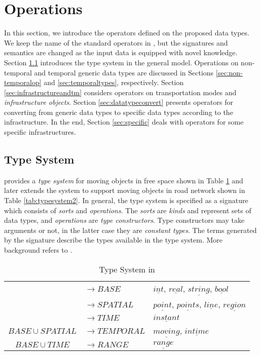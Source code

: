 \section{Operations}
\label{sec:operations}
In this section, we introduce the operators defined on the proposed data types. 
We keep the name of the standard operators in \cite{GBE+00}, but the signatures and semantics 
are changed as the input data is equipped with novel knowledge. Section \ref{sec:extendedtypesystem}
introduces the type system in the general model. 
Operations on non-temporal and temporal generic data types are discussed in Sections \ref{sec:non-temporalop} and \ref{sec:temporaltypes}, respectively. Section \ref{sec:infrastructureandtm} considers operators on transportation modes and \textit{infrastructure objects}.  Section \ref{sec:datatypeconvert} presents operators for converting from generic data types to specific data types according to the infrastructure. In the end, Section \ref{sec:specific} deals with operators for some specific infrastructures.


\subsection{Type System}
\label{sec:extendedtypesystem}
\cite{GBE+00} provides a \textit{type system} for moving objects in free space shown in Table \ref{tab:typesystem1} and later \cite{GA2006} extends the system to support moving objects 
in road network shown in Table \ref{tab:typesystem2}. In general, the type system is specified as a signature which consists of \textit{sorts} and \textit{operations}. 
The \textit{sorts} are \textit{kinds} and represent sets of data types, and  
\textit{operations} are \textit{type constructors}. Type constructors may take arguments or not, in the latter case they are \textit{constant types}. The terms generated by the signature
describe the types available in the type system. More background refers to \cite{G1993}.

\begin{table}[ht]
 \begin{center} 
  \begin{tabular}{c|l|l}
	\hline
	\multirow{3}{*}{}&$\rightarrow BASE$&$\underline{int}$, $\underline{real}$, $\underline{string}$, $\underline{bool}$ \\
	& $\rightarrow SPATIAL$& $\underline{point}$, $\underline{points}$, $\underline{line}$, $\underline{region}$\\
	& $\rightarrow TIME$& $\underline{instant}$\\
	\hline
	$BASE\cup SPATIAL$&$\rightarrow TEMPORAL$&$\underline{moving}$, $\underline{intime}$\\
	\hline
	$BASE\cup TIME$&$\rightarrow RANGE$&$\underline{range}$\\
	\hline
  \end{tabular}
 \end{center}
 \caption{\label{tab:typesystem1}Type System in \cite{GBE+00}}
\end{table}


